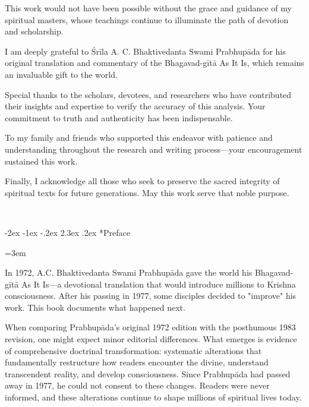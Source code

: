 \documentclass[12pt,twoside]{book}
\makeatletter
\newcommand{\forcenumbering}{\let\ps@plain\ps@fancy\let\ps@headings\ps@fancy}
\newcommand{\startmainmatter}{\clearpage\pagenumbering{arabic}\setcounter{page}{1}\pagestyle{fancy}\forcenumbering}
\renewcommand\section{\@startsection{section}{1}{\z@}%
{-2ex \@plus -1ex \@minus -.2ex}%
{2.3ex \@plus.2ex}%
{\normalfont\Large\bfseries}}
\makeatother
\begin{document}
This work would not have been possible without the grace and guidance of my spiritual masters, whose teachings continue to illuminate the path of devotion and scholarship.

I am deeply grateful to Śrīla A. C. Bhaktivedanta Swami Prabhupāda for his original translation and commentary of the Bhagavad-gītā As It Is, which remains an invaluable gift to the world.

Special thanks to the scholars, devotees, and researchers who have contributed their insights and expertise to verify the accuracy of this analysis. Your commitment to truth and authenticity has been indispensable.

To my family and friends who supported this endeavor with patience and understanding throughout the research and writing process—your encouragement sustained this work.

Finally, I acknowledge all those who seek to preserve the sacred integrity of spiritual texts for future generations. May this work serve that noble purpose.

\clearpage

\thispagestyle{frontmatter}
~
\clearpage

\startmainmatter
\pagestyle{fancy}

\section*{Preface}
\thispagestyle{sectionopening}
\setlength{\parskip}{3pt plus 1pt minus 1pt}
\emergencystretch=3em

In 1972, A.C. Bhaktivedanta Swami Prabhupāda gave the world his Bhagavad-gītā As It Is—a devotional translation that would introduce millions to Krishna consciousness. After his passing in 1977, some disciples decided to "improve" his work. This book documents what happened next.

When comparing Prabhupāda's original 1972 edition with the posthumous 1983 revision, one might expect minor editorial differences. What emerges is evidence of comprehensive doctrinal transformation: systematic alterations that fundamentally restructure how readers encounter the divine, understand transcendent reality, and develop consciousness. Since Prabhupāda had passed away in 1977, he could not consent to these changes. Readers were never informed, and these alterations continue to shape millions of spiritual lives today.
\end{document}
